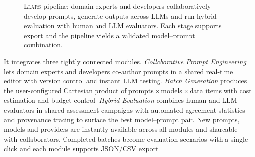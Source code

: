 \documentclass{article}
\begin{document}
\begin{figure}[t]
\caption{\textsc{Llars} pipeline: domain experts and developers collaboratively develop prompts, generate outputs across LLMs and run hybrid evaluation with human and LLM evaluators. Each stage supports export and the pipeline yields a validated model--prompt combination.}
\label{fig:pipeline}
\end{figure}

It integrates three tightly connected modules.
\emph{Collaborative Prompt Engineering} lets domain experts and developers co-author prompts in a shared real-time editor with version control and instant LLM testing.
\emph{Batch Generation} produces the user-configured Cartesian product of prompts\,$\times$\,models\,$\times$\,data items with cost estimation and budget control.
\emph{Hybrid Evaluation} combines human and LLM evaluators in shared assessment campaigns with automated agreement statistics and provenance tracing to surface the best model--prompt pair.
New prompts, models and providers are instantly available across all modules and shareable with collaborators. Completed batches become evaluation scenarios with a single click and each module supports JSON/CSV export.
\end{document}
